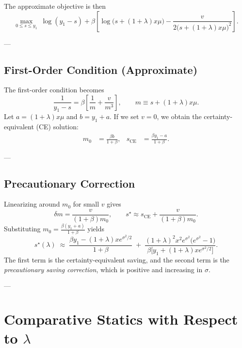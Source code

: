 \documentclass[12pt]{article}
\begin{document}
The approximate objective is then
\begin{equation}
    \max_{0\le s \le y_1}\;
    \log(y_1 - s)
    + \beta\!\left[
        \log\big(s+(1+\lambda)x\mu\big)
        - \frac{v}{2\big(s+(1+\lambda)x\mu\big)^2}
    \right].
\end{equation}

---

\subsection*{First-Order Condition (Approximate)}

The first-order condition becomes
\begin{equation}
    \frac{1}{y_1 - s}
    = \beta\!\left[
        \frac{1}{m}
        + \frac{v}{m^3}
    \right],
    \qquad
    m \equiv s + (1+\lambda)x\mu.
\end{equation}
Let \(a = (1+\lambda)x\mu\) and \(b = y_1 + a\).  
If we set \(v=0\), we obtain the certainty-equivalent (CE) solution:
\begin{align}
m_0 &= \frac{\beta b}{1+\beta},
&
s_{\mathrm{CE}} &= \frac{\beta y_1 - a}{1+\beta}.
\end{align}

---

\subsection*{Precautionary Correction}

Linearizing around \(m_0\) for small \(v\) gives
\[
\delta m = \frac{v}{(1+\beta)m_0},
\qquad
s^\star \approx s_{\mathrm{CE}} + \frac{v}{(1+\beta)m_0}.
\]
Substituting \(m_0=\tfrac{\beta(y_1+a)}{1+\beta}\) yields
\begin{equation}
\boxed{
s^\star(\lambda)
\;\approx\;
\frac{\beta y_1 - (1+\lambda)x e^{\sigma^2/2}}{1+\beta}
\;+\;
\frac{(1+\lambda)^2 x^2 e^{\sigma^2}\!\big(e^{\sigma^2}-1\big)}
{\beta\big[y_1 + (1+\lambda)x e^{\sigma^2/2}\big]}.
}
\label{eq:s_approx}
\end{equation}
The first term is the certainty-equivalent saving, and the second term is the \emph{precautionary saving correction}, which is positive and increasing in \(\sigma\).

---

\section{Comparative Statics with Respect to \(\lambda\)}
\end{document}
